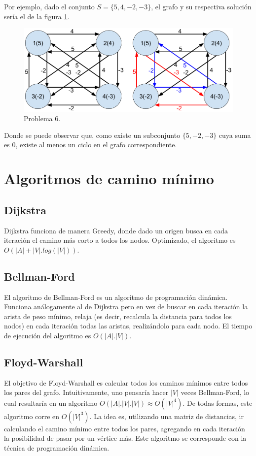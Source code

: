 \documentclass[a4paper,10pt]{article}
\begin{document}
	Por ejemplo, dado el conjunto $S = \{5, 4, -2, -3\}$, el grafo y su respectiva solución sería el de la figura \ref{fig:punto-6}.

	\begin{figure}[!htb]
		\centering
		\includegraphics[scale=0.4]{images/grafo-6.png}
		\caption{Problema 6.}
		\label{fig:punto-6}
	\end{figure}

	Donde se puede observar que, como existe un subconjunto $\{5, -2, -3\}$ cuya suma es 0, existe al menos un ciclo en el grafo correspondiente.

\section{Algoritmos de camino mínimo}
\subsection{Dijkstra}
	Dijkstra funciona de manera Greedy, donde dado un origen busca en cada iteración el camino más corto a todos los nodos. Optimizado, el algoritmo es $O(|A|+|V|.log(|V|))$.

\subsection{Bellman-Ford}
	El algoritmo de Bellman-Ford es un algoritmo de programación dinámica. Funciona análogamente al de Dijkstra pero en vez de buscar en cada iteración la arista de peso mínimo, relaja (es decir, recalcula la distancia para todos los nodos) en cada iteración todas las aristas, realizándolo para cada nodo. El tiempo de ejecución del algoritmo es $O(|A|.|V|)$.

\subsection{Floyd-Warshall}
	El objetivo de Floyd-Warshall es calcular todos los caminos mínimos entre todos los pares del grafo. Intuitivamente, uno pensaría hacer $|V|$ veces Bellman-Ford, lo cual resultaría en un algoritmo $O(|A|.|V|.|V|) \approx O(|V|^4)$. De todas formas, este algoritmo corre en $O(|V|^3)$. La idea es, utilizando una matriz de distancias, ir calculando el camino mínimo entre todos los pares, agregando en cada iteración la posibilidad de pasar por un vértice más. Este algoritmo se corresponde con la técnica de programación dinámica.
\end{document}
